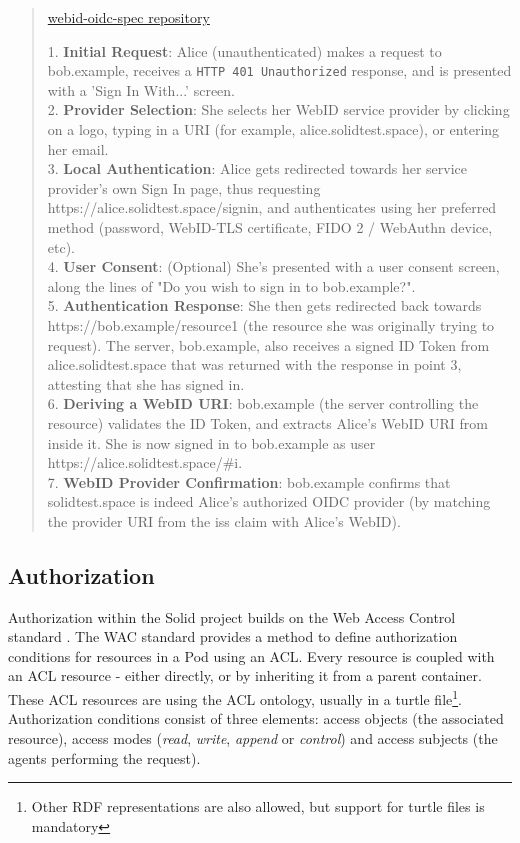 \begin{quote}{\href{https://github.com/solid/webid-oidc-spec}{webid-oidc-spec repository}}

    1. \textbf{Initial Request}: Alice (unauthenticated) makes a request to bob.example, receives a \texttt{HTTP 401 Unauthorized} response, and is presented with a 'Sign In With...' screen.\\
    
    2. \textbf{Provider Selection}: She selects her WebID service provider by clicking on a logo, typing in a URI (for example, alice.solidtest.space), or entering her email.\\
    
    3. \textbf{Local Authentication}: Alice gets redirected towards her service provider's own Sign In page, thus requesting https://alice.solidtest.space/signin, and authenticates using her preferred method (password, WebID-TLS certificate, FIDO 2 / WebAuthn device, etc).\\
    
    4. \textbf{User Consent}: (Optional) She's presented with a user consent screen, along the lines of "Do you wish to sign in to bob.example?".\\
    
    5. \textbf{Authentication Response}: She then gets redirected back towards https://bob.example/resource1 (the resource she was originally trying to request). The server, bob.example, also receives a signed ID Token from alice.solidtest.space that was returned with the response in point 3, attesting that she has signed in.\\
    
    6. \textbf{Deriving a WebID URI}: bob.example (the server controlling the resource) validates the ID Token, and extracts Alice's WebID URI from inside it. She is now signed in to bob.example as user https://alice.solidtest.space/\#i.\\
    
    7. \textbf{WebID Provider Confirmation}: bob.example confirms that solidtest.space is indeed Alice's authorized OIDC provider (by matching the provider URI from the iss claim with Alice's WebID).

\end{quote}

\subsection{Authorization}
Authorization within the Solid project builds on the Web Access Control standard \citep{wac}. The WAC standard provides a method to define authorization conditions for resources in a Pod using an \gls{ACL}. Every resource is coupled with an \gls{ACL} resource - either directly, or by inheriting it from a parent container. These \gls{ACL} resources are using the ACL ontology, usually in a turtle file\footnote{Other \gls{RDF} representations are also allowed, but support for turtle files is mandatory}. Authorization conditions consist of three elements: access objects (the associated resource), access modes (\textit{read}, \textit{write}, \textit{append} or \textit{control}) and access subjects (the agents performing the request).

